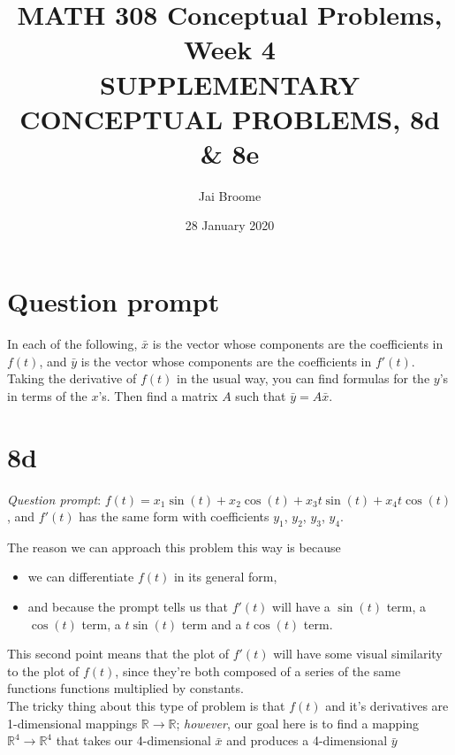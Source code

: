 \documentclass[12pt]{article}
\title{MATH 308 Conceptual Problems, Week 4 \vspace{1em}\\\normalsize{SUPPLEMENTARY CONCEPTUAL PROBLEMS, 8d \& 8e}}
\author{Jai Broome}
\date{28 January 2020}
\begin{document}
\maketitle

\section{Question prompt}

In each of the following, $\bar{x}$ is the vector whose components are the coefficients
in $f(t)$, and $\bar{y}$ is the vector whose components are the coefficients in $f'(t)$. Taking
the derivative of $f(t)$ in the usual way, you can find formulas for the $y$'s in terms
of the $x$'s. Then find a matrix $A$ such that $\bar{y}=A\bar{x}$.

\section{8d}
\textit{Question prompt}: $f(t) = x_1\sin(t) + x_2\cos(t) + x_3t\sin(t) + x_4t\cos(t)$,
and $f'(t)$ has the same form with coefficients $y_1$, $y_2$, $y_3$, $y_4$.

The reason we can approach this problem this way is because
\begin{itemize}
  \item we can differentiate $f(t)$ in its general form, 
  \item and because the prompt tells us that $f'(t)$ will have a $\sin(t)$ term,
    a $\cos(t)$ term, a $t\sin(t)$ term and a $t\cos(t)$ term.
\end{itemize}

This second point means that the plot of $f'(t)$ will have some visual
similarity to the plot of $f(t)$, since they're both composed of a series of
the same functions functions multiplied by constants. \\

The tricky thing about this type of problem is that $f(t)$ and it's derivatives are 1-dimensional
mappings $\mathbb{R} \rightarrow \mathbb{R}$; \textit{however}, our goal here is to find a mapping
$\mathbb{R}^4 \rightarrow \mathbb{R}^4$ that takes our 4-dimensional $\bar{x}$ and produces a
4-dimensional $\bar{y}$
\end{document}
